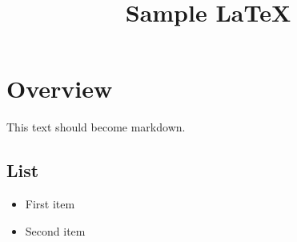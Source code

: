 \title{Sample LaTeX}
\section{Overview}
This text should become markdown.
\subsection{List}
\begin{itemize}
\item First item
\item Second item
\end{itemize}
